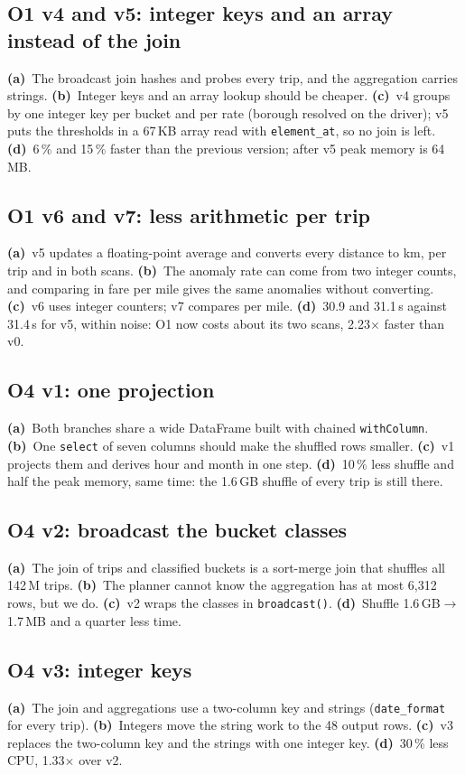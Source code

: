 \documentclass[sigconf]{acmart}
\newcommand{\pa}{\textbf{(a)}~}\newcommand{\pb}{\textbf{(b)}~}\newcommand{\pc}{\textbf{(c)}~}\newcommand{\pd}{\textbf{(d)}~}
\begin{document}
\subsection{O1 v4 and v5: integer keys and an array instead of the join}
\pa The broadcast join hashes and probes every trip, and the aggregation carries strings. \pb Integer keys and an array lookup should
be cheaper. \pc v4 groups by one integer key per bucket and per rate (borough resolved on the driver); v5 puts the thresholds in a
67\,KB array read with \texttt{element\_at}, so no join is left. \pd 6\,\% and 15\,\% faster than the previous version; after v5 peak memory is 64\,MB.

\subsection{O1 v6 and v7: less arithmetic per trip}
\pa v5 updates a floating-point average and converts every distance to km, per trip and in both scans. \pb The anomaly rate
can come from two integer counts, and comparing in fare per mile gives the same anomalies without converting. \pc v6 uses integer
counters; v7 compares per mile. \pd 30.9 and 31.1\,s against 31.4\,s for v5, within noise: O1 now costs about its two scans,
2.23$\times$ faster than v0.

\subsection{O4 v1: one projection}
\pa Both branches share a wide DataFrame built with chained \texttt{withColumn}. \pb One \texttt{select} of seven columns should
make the shuffled rows smaller. \pc v1 projects them and derives hour and month in one step. \pd 10\,\% less shuffle and half the
peak memory, same time: the 1.6\,GB shuffle of every trip is still there.

\subsection{O4 v2: broadcast the bucket classes}
\pa The join of trips and classified buckets is a sort-merge join that shuffles all 142\,M trips. \pb The planner cannot know the
aggregation has at most 6{,}312 rows, but we do. \pc v2 wraps the classes in \texttt{broadcast()}. \pd Shuffle
1.6\,GB$\rightarrow$1.7\,MB and a quarter less time.

\subsection{O4 v3: integer keys}
\pa The join and aggregations use a two-column key and strings (\texttt{date\_format} for every trip). \pb Integers move the string
work to the 48 output rows. \pc v3 replaces the two-column key and the strings with one integer key. \pd 30\,\% less CPU, 1.33$\times$ over v2.
\end{document}
